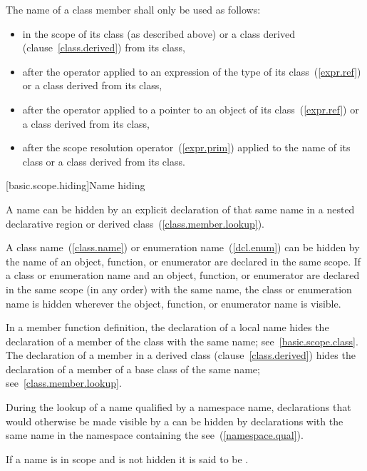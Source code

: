 \pnum
The name of a class member shall only be used as follows:

\begin{itemize}
\item in the scope of its class (as described above) or a class derived
(clause~\ref{class.derived}) from its class,
\item after the  operator applied to an expression of the type
of its class~(\ref{expr.ref}) or a class derived from its class,
\item after the \tcode{->} operator applied to a pointer to an object of
its class~(\ref{expr.ref}) or a class derived from its class,
\item after the \tcode{::} scope resolution operator~(\ref{expr.prim})
applied to the name of its class or a class derived from its class.
\end{itemize}

[basic.scope.hiding]{Name hiding}

\pnum
{}%
%
%
A name can be hidden by an explicit declaration of that same name in a
nested declarative region or derived class~(\ref{class.member.lookup}).

\pnum
{}%
A class name~(\ref{class.name}) or enumeration name~(\ref{dcl.enum}) can
be hidden by the name of an object, function, or enumerator are declared in
the same scope. If a class or enumeration name and an object, function,
or enumerator are declared in the same scope (in any order) with the
same name, the class or enumeration name is hidden wherever the object,
function, or enumerator name is visible.

\pnum
In a member function definition, the declaration of a local name hides
the declaration of a member of the class with the same name;
see~\ref{basic.scope.class}. The declaration of a member in a derived
class (clause~\ref{class.derived}) hides the declaration of a member of
a base class of the same name; see~\ref{class.member.lookup}.

\pnum
During the lookup of a name qualified by a namespace name, declarations
that would otherwise be made visible by a  can
be hidden by declarations with the same name in the namespace containing
the  see~(\ref{namespace.qual}).

\pnum
{}%
If a name is in scope and is not hidden it is said to be .%

